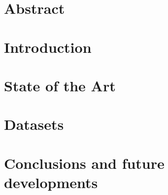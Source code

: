 \documentclass{report}
\begin{document}


\chapter*{Abstract}


\tableofcontents

\chapter{Introduction}


\chapter{State of the Art}


\chapter{Datasets}

\chapter{Conclusions and future developments}

\end{document}
